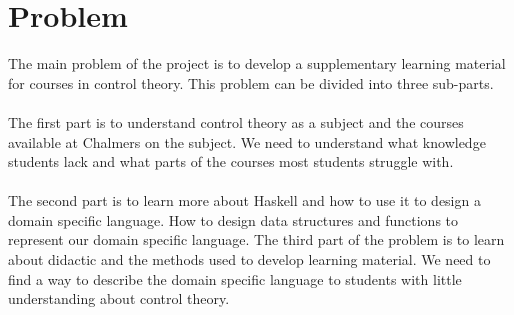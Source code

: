 \section{Problem}
The main problem of the project is to develop a supplementary learning material for courses in control theory. This problem can be divided into three sub-parts.
\\ \\
The first part is to understand control theory as a subject and the courses available at Chalmers on the subject. We need to understand what knowledge students lack and what parts of the courses most students struggle with.
\\ \\
The second part is to learn more about Haskell and how to use it to design a domain specific language. How to design data structures and functions to represent our domain specific language.
The third part of the problem is to learn about didactic and the methods used to develop learning material. We need to find a way to describe the domain specific language to students with little understanding about control theory.
